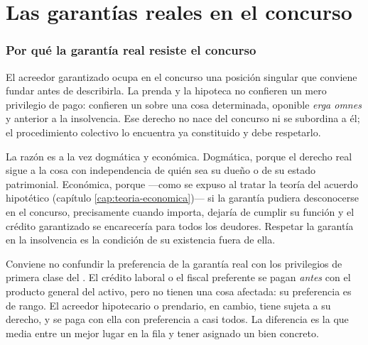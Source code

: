 \chapter{Las garantías reales en el concurso}
\label{cap:garantias-reales}


\bloqueTeorico

\subsection{Por qué la garantía real resiste el concurso}

El acreedor garantizado ocupa en el concurso una posición singular que conviene fundar antes de
describirla. La prenda y la hipoteca no confieren un mero privilegio de pago: confieren un
 sobre una cosa determinada, oponible \emph{erga omnes} y anterior a la
insolvencia. Ese derecho no nace del concurso ni se subordina a él; el procedimiento colectivo lo
encuentra ya constituido y debe respetarlo.

La razón es a la vez dogmática y económica. Dogmática, porque el derecho real sigue a la cosa con
independencia de quién sea su dueño o de su estado patrimonial. Económica, porque ---como se expuso
al tratar la teoría del acuerdo hipotético (capítulo \ref{cap:teoria-economica})--- si la garantía
pudiera desconocerse en el concurso, precisamente cuando importa, dejaría de cumplir su función y el
crédito garantizado se encarecería para todos los deudores. Respetar la garantía en la insolvencia
es la condición de su existencia fuera de ella.

\begin{foco}
Conviene no confundir la preferencia de la garantía real con los privilegios de primera clase del
. El crédito laboral o el fiscal preferente se pagan \emph{antes} con el producto
general del activo, pero no tienen una cosa afectada: su preferencia es de rango. El acreedor
hipotecario o prendario, en cambio, tiene  sujeta a su derecho, y se
paga con ella con preferencia a casi todos. La diferencia es la que media entre un mejor lugar en la
fila y tener asignado un bien concreto.
\end{foco}

